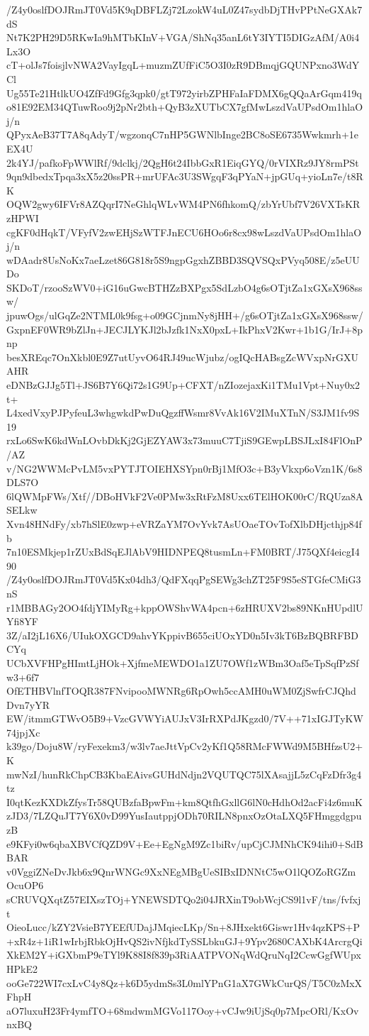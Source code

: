 /Z4y0oslfDOJRmJT0Vd5K9qDBFLZj72LzokW4uL0Z47sydbDjTHvPPtNeGXAk7dS
Nt7K2PH29D5RKwIa9hMTbKInV+VGA/ShNq35anL6tY3IYTI5DIGzAfM/A0i4Lx3O
cT+olJs7foisjlvNWA2VayIgqL+muzmZUfFiC5O3I0zR9DBmqjGQUNPxno3WdYCl
Ug55Te21HtlkUO4ZfFd9Gfg3qpk0/gtT972yirbZPHFaIaFDMX6gQQaArGqm419q
o81E92EM34QTuwRoo9j2pNr2bth+QyB3zXUTbCX7gfMwLszdVaUPsdOm1hlaOj/n
QPyxAeB37T7A8qAdyT/wgzonqC7nHP5GWNlbInge2BC8oSE6735Wwkmrh+1eEX4U
2k4YJ/pafkoFpWWlRf/9dclkj/2QgH6t24IbbGxR1EiqGYQ/0rVIXRz9JY8rmPSt
9qn9dbedxTpqa3xX5z20ssPR+mrUFAc3U3SWgqF3qPYaN+jpGUq+yioLn7e/t8RK
OQW2gwy6IFVr8AZQqrI7NeGhlqWLvWM4PN6fhkomQ/zbYrUbf7V26VXTsKRzHPWI
cgKF0dHqkT/VFyfV2zwEHjSzWTFJnECU6HOo6r8cx98wLszdVaUPsdOm1hlaOj/n
wDAadr8UsNoKx7aeLzet86G818r5S9ngpGgxhZBBD3SQVSQxPVyq508E/z5eUUDo
SKDoT/rzooSzWV0+iG16uGwcBTHZzBXPgx5SdLzbO4g6sOTjtZa1xGXsX968ssw/
jpuwOgs/ulGqZe2NTML0k9fsg+o09GCjnmNy8jHH+/g6sOTjtZa1xGXsX968ssw/
GxpnEF0WR9bZlJn+JECJLYKJl2bJzfk1NxX0pxL+IkPhxV2Kwr+1b1G/IrJ+8pnp
besXREqc7OnXkbl0E9Z7utUyvO64RJ49ucWjubz/ogIQcHABsgZcWVxpNrGXUAHR
eDNBzGJJg5Tl+JS6B7Y6Qi72s1G9Up+CFXT/nZIozejaxKi1TMu1Vpt+Nuy0x2t+
L4xedVxyPJPyfeuL3whgwkdPwDuQgzffWsmr8VvAk16V2IMuXTnN/S3JM1fv9S19
rxLo6SwK6kdWnLOvbDkKj2GjEZYAW3x73muuC7TjiS9GEwpLBSJLxI84FlOnP/AZ
v/NG2WWMcPvLM5vxPYTJTOIEHXSYpn0rBj1MfO3c+B3yVkxp6oVzn1K/6s8DLS7O
6lQWMpFWs/Xtf//DBoHVkF2Ve0PMw3xRtFzM8Uxx6TElHOK00rC/RQUza8ASELkw
Xvn48HNdFy/xb7hSlE0zwp+eVRZaYM7OvYvk7AsUOaeTOvTofXlbDHjcthjp84fb
7n10ESMkjep1rZUxBdSqEJlAbV9HIDNPEQ8tusmLn+FM0BRT/J75QXf4eicgI490
/Z4y0oslfDOJRmJT0Vd5Kx04dh3/QdFXqqPgSEWg3chZT25F9S5eSTGfeCMiG3nS
r1MBBAGy2OO4fdjYIMyRg+kppOWShvWA4pcn+6zHRUXV2bs89NKnHUpdlUYfi8YF
3Z/aI2jL16X6/UIukOXGCD9ahvYKppivB655ciUOxYD0n5Iv3kT6BzBQBRFBDCYq
UCbXVFHPgHImtLjHOk+XjfmeMEWDO1a1ZU7OWf1zWBm3Oaf5eTpSqfPzSfw3+6f7
OfETHBVlnfTOQR387FNvipooMWNRg6RpOwh5ccAMH0uWM0ZjSwfrCJQhdDvn7yYR
EW/itmmGTWvO5B9+VzcGVWYiAUJxV3IrRXPdJKgzd0/7V++71xIGJTyKW74jpjXc
k39go/Doju8W/ryFexekm3/w3lv7aeJttVpCv2yKf1Q58RMcFWWd9M5BHfzsU2+K
mwNzI/hunRkChpCB3KbaEAivsGUHdNdjn2VQUTQC75lXAsajjL5zCqFzDfr3g4tz
I0qtKezKXDkZfysTr58QUBzfaBpwFm+km8QtfhGxllG6lN0cHdhOd2acFi4z6muK
zJD3/7LZQuJT7Y6X0vD99YusIautppjODh70RILN8pnxOzOtaLXQ5FHmggdgpuzB
e9KFyi0w6qbaXBVCfQZD9V+Ee+EgNgM9Zc1biRv/upCjCJMNhCK94ihi0+SdBBAR
v0VggiZNeDvJkb6x9QnrWNGc9XxNEgMBgUeSIBxIDNNtC5wO1lQOZoRGZmOcuOP6
sCRUVQXqtZ57EIXszTOj+YNEWSDTQo2i04JRXinT9obWcjCS9l1vF/tns/fvfxjt
OieoLucc/kZY2VsieB7YEEfUDajJMqiecLKp/Sn+8JHxekt6Giswr1Hv4qzKPS+P
+xR4z+1iR1wIrbjRbkOjHvQS2ivNfjkdTySSLbkuGJ+9Ypv2680CAXbK4ArcrgQi
XkEM2Y+iGXbmP9eTYl9K88I8f839p3RiAATPVONqWdQruNqI2CcwGgfWUpxHPkE2
ooGe722WI7cxLvC4y8Qz+k6D5ydmSs3L0mlYPnG1aX7GWkCurQS/T5C0zMxXFhpH
aO7luxuH23Fr4ymfTO+68mdwmMGVo117Ooy+vCJw9iUjSq0p7MpcORl/KxOvnxBQ
